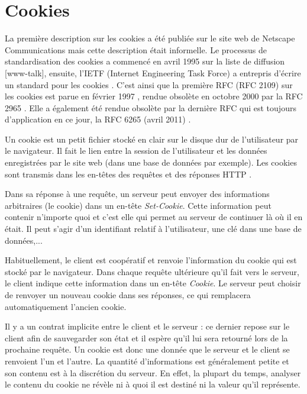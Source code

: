 	
\section{Cookies}
\label{cookies-expl}
La première description sur les cookies a été publiée sur le site web de Netscape Communications mais cette description était informelle. Le processus de standardisation des cookies a commencé en avril 1995 sur la liste de diffusion [www-talk], ensuite, l'IETF (Internet Engineering Task Force) a entrepris d'écrire un standard pour les cookies \cite{Kristol:2001:HCS:502152.502153}.
C'est ainsi que la première RFC (RFC 2109) sur les cookies est parue en février 1997 \cite{IETF_RFC2109}, rendue obsolète en octobre 2000 par la RFC 2965 \cite{IETF_RFC2965}. Elle a également été rendue obsolète par la dernière RFC qui est toujours d'application en ce jour, la RFC 6265 (avril 2011) \cite{IETF_RFC6265}.
\newline

Un cookie est un petit fichier stocké en clair sur le disque dur de l'utilisateur par le navigateur. Il fait le lien entre la session de l'utilisateur et les données enregistrées par le site web (dans une base de données par exemple). Les cookies sont transmis dans les en-têtes des requêtes et des réponses HTTP \cite{IETF_RFC6265}.

Dans sa réponse à une requête, un serveur peut envoyer des informations arbitraires (le cookie) dans un en-tête \textit{Set-Cookie}. Cette information peut contenir n'importe quoi et c'est elle qui permet au serveur de continuer là où il en était. Il peut s'agir d'un identifiant relatif à l'utilisateur, une clé dans une base de données,...

Habituellement, le client est coopératif et renvoie l'information du cookie qui est stocké par le navigateur. Dans chaque requête ultérieure qu'il fait vers le serveur, le client indique cette information dans un en-tête \textit{Cookie}. Le serveur peut choisir de renvoyer un nouveau cookie dans ses réponses, ce qui remplacera automatiquement l'ancien cookie.
\newline

Il y a un contrat implicite entre le client et le serveur : ce dernier repose sur le client afin de sauvegarder son état et il espère qu'il lui sera retourné lors de la prochaine requête.
Un cookie est donc une donnée que le serveur et le client se renvoient l'un et l'autre. La quantité d'informations est généralement petite et son contenu est à la discrétion du serveur. En effet, la plupart du temps, analyser le contenu du cookie ne révèle ni à quoi il est destiné ni la valeur qu'il représente.
\newline

